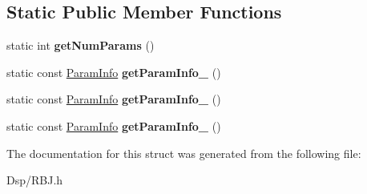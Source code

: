 \subsection*{Static Public Member Functions}
\begin{DoxyCompactItemize}
\item 
\hypertarget{structDsp_1_1RBJ_1_1Design_1_1TypeIVBase_a8fee2a8d3ed4b303ba4632551f953d55}{static int {\bfseries get\-Num\-Params} ()}\label{structDsp_1_1RBJ_1_1Design_1_1TypeIVBase_a8fee2a8d3ed4b303ba4632551f953d55}

\item 
\hypertarget{structDsp_1_1RBJ_1_1Design_1_1TypeIVBase_acd9cab454f7010c4e7fb669afedf4639}{static const \hyperlink{classDsp_1_1ParamInfo}{Param\-Info} {\bfseries get\-Param\-Info\-\_} ()}\label{structDsp_1_1RBJ_1_1Design_1_1TypeIVBase_acd9cab454f7010c4e7fb669afedf4639}

\item 
\hypertarget{structDsp_1_1RBJ_1_1Design_1_1TypeIVBase_acb25d28cbaa418fc795d18e327200cb7}{static const \hyperlink{classDsp_1_1ParamInfo}{Param\-Info} {\bfseries get\-Param\-Info\-\_} ()}\label{structDsp_1_1RBJ_1_1Design_1_1TypeIVBase_acb25d28cbaa418fc795d18e327200cb7}

\item 
\hypertarget{structDsp_1_1RBJ_1_1Design_1_1TypeIVBase_a08d7e68b50123b5a576d883ab188d02c}{static const \hyperlink{classDsp_1_1ParamInfo}{Param\-Info} {\bfseries get\-Param\-Info\-\_} ()}\label{structDsp_1_1RBJ_1_1Design_1_1TypeIVBase_a08d7e68b50123b5a576d883ab188d02c}

\end{DoxyCompactItemize}


The documentation for this struct was generated from the following file\-:\begin{DoxyCompactItemize}
\item 
Dsp/R\-B\-J.\-h\end{DoxyCompactItemize}
